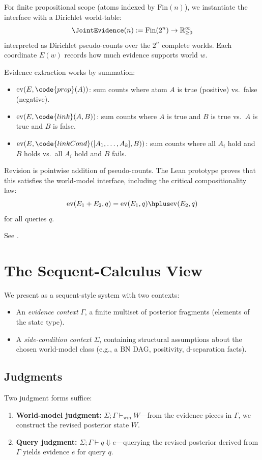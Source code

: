 \documentclass[11pt,openany]{report}
\begin{document}
For finite propositional scope (atoms indexed by $\mathrm{Fin}(n)$), we
instantiate the \WorldModel{} interface with a Dirichlet world-table:
\[
  \JointEvidence(n) := \mathrm{Fin}(2^n) \to \mathbb{R}_{\ge 0}^{\infty}
\]
interpreted as Dirichlet pseudo-counts over the $2^n$ complete worlds.
Each coordinate $E(w)$ records how much evidence supports world $w$.

Evidence extraction works by summation:
\begin{itemize}
\item $\mathrm{ev}(E, \code{prop}(A))$: sum counts where atom $A$ is true
  (positive) vs.\ false (negative).
\item $\mathrm{ev}(E, \code{link}(A, B))$: sum counts where $A$ is true
  and $B$ is true vs.\ $A$ is true and $B$ is false.
\item $\mathrm{ev}(E, \code{linkCond}([A_1, \ldots, A_k], B))$: sum counts
  where all $A_i$ hold and $B$ holds vs.\ all $A_i$ hold and $B$ fails.
\end{itemize}

Revision is pointwise addition of pseudo-counts.  The Lean prototype proves
that this satisfies the world-model interface, including the critical
compositionality law:
\[
  \mathrm{ev}(E_1 + E_2, q) = \mathrm{ev}(E_1, q) \hplus \mathrm{ev}(E_2, q)
\]
for all queries $q$.

See .

\section{The Sequent-Calculus View}

We present \xiPLN{} as a sequent-style system with two contexts:
\begin{itemize}
\item An \emph{evidence context} $\Gamma$, a finite multiset of posterior
  fragments (elements of the state type).
\item A \emph{side-condition context} $\Sigma$, containing structural
  assumptions about the chosen world-model class (e.g., a BN DAG,
  positivity, d-separation facts).
\end{itemize}

\subsection{Judgments}

Two judgment forms suffice:
\begin{enumerate}
\item \textbf{World-model judgment:}
  $\Sigma; \Gamma \vdash_{\mathrm{wm}} W$---from the evidence pieces in
  $\Gamma$, we construct the revised posterior state $W$.

\item \textbf{Query judgment:}
  $\Sigma; \Gamma \vdash q \Downarrow e$---querying the revised posterior
  derived from $\Gamma$ yields evidence $e$ for query $q$.
\end{enumerate}
\end{document}
